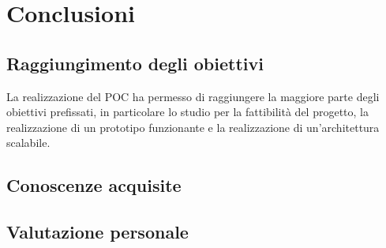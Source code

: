 \chapter{Conclusioni}
\label{cap:conclusioni}

\section{Raggiungimento degli obiettivi}
La realizzazione del POC ha permesso di raggiungere la maggiore parte degli obiettivi prefissati, in particolare lo studio per la fattibilità del progetto, la realizzazione di un prototipo funzionante e la realizzazione di un'architettura scalabile.\\

\section{Conoscenze acquisite}

\section{Valutazione personale}
